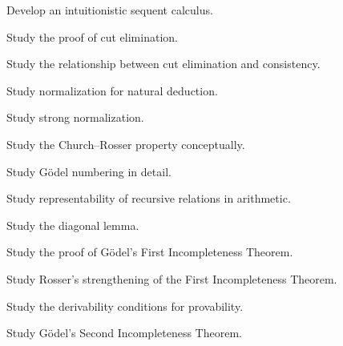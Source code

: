 \begin{exercise}[4]
Develop an intuitionistic sequent calculus.
\end{exercise}

\begin{exercise}[4]
Study the proof of cut elimination.
\end{exercise}

\begin{exercise}[4]
Study the relationship between cut elimination and consistency.
\end{exercise}

\begin{exercise}[4]
Study normalization for natural deduction.
\end{exercise}

\begin{exercise}[4]
Study strong normalization.
\end{exercise}

\begin{exercise}[4]
Study the Church--Rosser property conceptually.
\end{exercise}

\begin{exercise}[4]
Study Gödel numbering in detail.
\end{exercise}

\begin{exercise}[4]
Study representability of recursive relations in arithmetic.
\end{exercise}

\begin{exercise}[4]
Study the diagonal lemma.
\end{exercise}

\begin{exercise}[4]
Study the proof of Gödel's First Incompleteness Theorem.
\end{exercise}

\begin{exercise}[4]
Study Rosser's strengthening of the First Incompleteness Theorem.
\end{exercise}

\begin{exercise}[4]
Study the derivability conditions for provability.
\end{exercise}

\begin{exercise}[4]
Study Gödel's Second Incompleteness Theorem.
\end{exercise}

